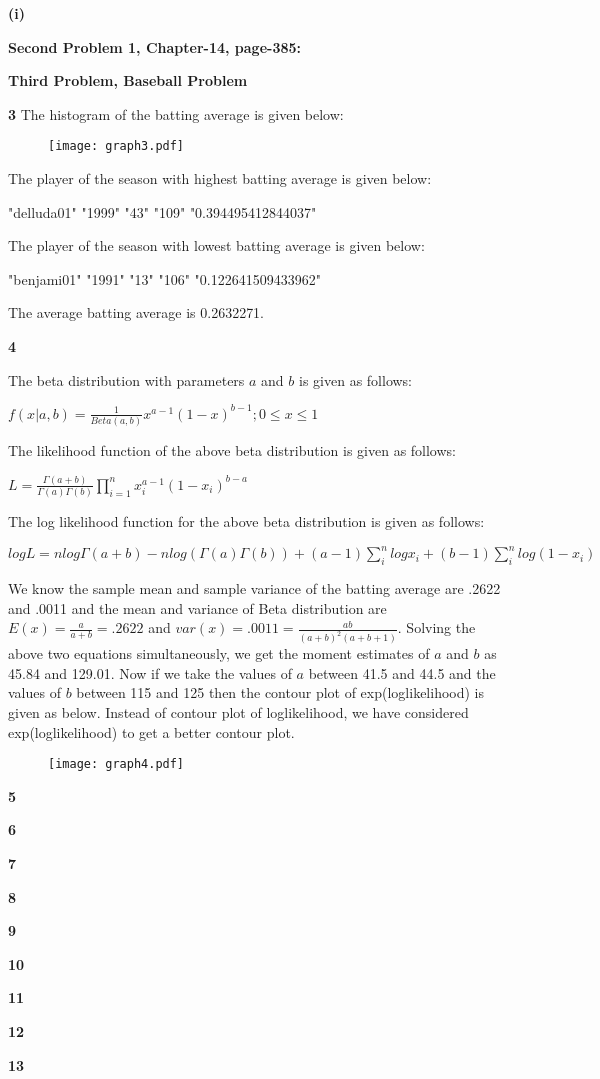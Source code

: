 \documentclass[10pt]{article}
\begin{document}
\textbf{(i)}

\textbf{Second Problem 1, Chapter-14, page-385:}

\textbf{Third Problem, Baseball Problem}

\textbf{3}
The histogram of the batting average is given below:

\begin{figure}[ht]
\centering
\texttt{[image: graph3.pdf]}
\end{figure}

The player of the season with highest batting average is given below:

"delluda01" "1999" "43" "109" "0.394495412844037"

The player of the season with lowest batting average is given below:

"benjami01" "1991" "13" "106" "0.122641509433962"

The average batting average is  0.2632271.

\textbf{4}

The beta distribution with parameters $a$ and $b$ is given as follows:

$f(x|a,b)=\frac{1}{Beta(a,b)}x^{a-1}(1-x)^{b-1}; 0\leq x \leq 1$

The likelihood function of the above beta distribution is given as follows:

$L=\frac{\Gamma(a+b)}{\Gamma(a)\Gamma(b)}\prod_{i=1}^{n}x_{i}^{a-1}(1-x_{i})^{b-a}$

The log likelihood function for the above beta distribution is given as follows:

$logL=nlog\Gamma(a+b)-nlog(\Gamma(a)\Gamma(b))+(a-1)\sum_{i}^{n}logx_{i}+(b-1)\sum_{i}^{n}log(1-x_{i})$

We know the sample mean and sample variance of the batting average are .2622 and .0011 and the mean and variance of Beta distribution are $E(x)=\frac{a}{a+b}=.2622$ and $var(x)=.0011=\frac{ab}{(a+b)^2(a+b+1)}$. Solving the above two equations simultaneously, we get the moment estimates of $a$ and $b$ as 45.84 and 129.01. Now if we take the values of $a$ between 41.5 and 44.5 and the values of $b$ between 115 and 125 then the contour plot of exp(loglikelihood) is given as below. Instead of contour plot of loglikelihood, we have considered exp(loglikelihood) to get a better contour plot.

\begin{figure}[ht]
\centering
\texttt{[image: graph4.pdf]}
\end{figure}




\textbf{5}

\textbf{6}

\textbf{7}

\textbf{8}

\textbf{9}

\textbf{10}

\textbf{11}

\textbf{12}

\textbf{13}
\end{document}
